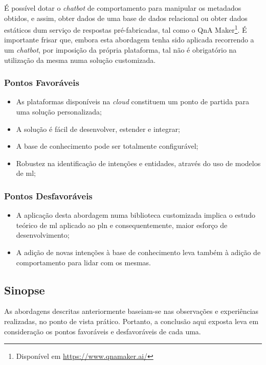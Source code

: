 É possível dotar o \textit{chatbot} de comportamento para manipular os metadados obtidos, e assim, obter dados de uma base de dados relacional ou obter dados estáticos dum serviço de respostas pré-fabricadas, tal como o QnA Maker\footnote{Disponível em \url{https://www.qnamaker.ai/}}. É importante frisar que, embora esta abordagem tenha sido aplicada recorrendo a um \textit{chatbot}, por imposição da própria plataforma, tal não é obrigatório na utilização da mesma numa solução customizada. 

\subsubsection*{Pontos Favoráveis}
\begin{itemize}
    \item
    {
        As plataformas disponíveis na \textit{cloud} constituem um ponto de partida para uma solução personalizada;
    }
    \item
    {
        A solução é fácil de desenvolver, estender e integrar;
    }
    \item
    {
        A base de conhecimento pode ser totalmente configurável;
    }
    \item
    {
        Robustez na identificação de intenções e entidades, através do uso de modelos de \gls{ml};
    }
\end{itemize}

\subsubsection*{Pontos Desfavoráveis}
\begin{itemize}
    \item
    {
        A aplicação desta abordagem numa biblioteca customizada implica o estudo teórico de \gls{ml} aplicado ao \gls{pln} e consequentemente, maior esforço de desenvolvimento;
    }
    \item
    {
        A adição de novas intenções à base de conhecimento leva também à adição de comportamento para lidar com os mesmas.
    }
\end{itemize}

\subsection{Sinopse}
As abordagens descritas anteriormente baseiam-se nas observações e experiências realizadas, no ponto de vista prático. Portanto, a conclusão aqui exposta leva em consideração os pontos favoráveis e desfavoráveis de cada uma.

